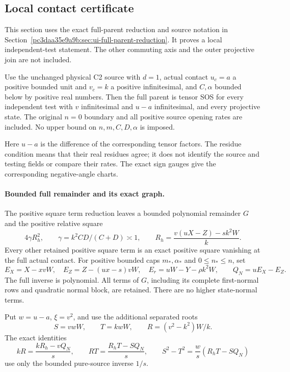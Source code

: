 \subsection{Local contact certificate}
\label{component:p76545700d90b}

\label{p76545700d90b:sec:local-ui-certificate}

This section uses the exact full-parent reduction and source notation
in Section~\ref{pc3daa35e9a9b:sec:ui-full-parent-reduction}. It proves a local independent-test
statement. The other commuting axis and the outer projective join
are not included.

\begin{theorem}
Use the unchanged physical C2 source with $d=1$, actual contact
$u_c=a$ a positive bounded unit and $v_c=k$ a positive infinitesimal,
and $C,\alpha$ bounded below by positive real numbers. Then the full
parent is tensor SOS for every independent test with $v$ infinitesimal
and $u-a$ infinitesimal, and every projective state. The original
$n=0$ boundary and all positive source opening rates are included.
No upper bound on $n,m,C,D,\alpha$ is imposed.
\end{theorem}

Here $u-a$ is the difference of the corresponding tensor factors.
The residue condition means that their real residues agree; it does
not identify the source and testing fields or compare their rates.
The exact sign gauges give the corresponding negative-angle charts.

\paragraph{Bounded full remainder and its exact graph.}
The positive square term reduction leaves a bounded polynomial remainder $G$ and
the positive relative square
\[
 4\gamma R_h^2,\qquad
 \gamma=k^2CD/(C+D)\asymp1,\qquad
 R_h=\frac{v(uX-Z)-s k^2W}{k}.
\]
Every other retained positive square term is an exact positive square vanishing
at the full actual contact. For positive bounded caps $m_*,\alpha_*$
and $0\le n_*\le n$, set
\[
 E_X=X-xvW,\quad E_Z=Z-(ux-s)vW,\quad
 E_r=uW-Y-\rho k^2W,
 \qquad Q_N=uE_X-E_Z.
\]
The full inverse is polynomial. All terms of $G$, including its
complete first-normal rows and quadratic normal block, are retained.
There are no higher state-normal terms.

Put $w=u-a$, $\xi=v^2$, and use the additional separated roots
\[
 S=vwW,\qquad T=kwW,\qquad R=(v^2-k^2)W/k.
\]
The exact identities
\[
 kR=\frac{kR_h-vQ_N}{s},\qquad
 RT=\frac{R_hT-SQ_N}{s},\qquad
 S^2-T^2=\frac w s(R_hT-SQ_N)                      \tag{UI1}
\]
use only the bounded pure-source inverse $1/s$.

